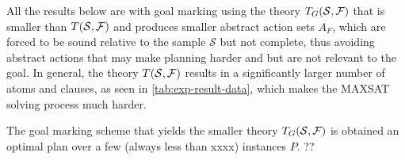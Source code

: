 \documentclass[letterpaper]{article} %
\newcommand{\abs}[1]{\ensuremath{\left\vert{#1}\right\vert}}
\newcommand{\Q}{\mathcal{Q}}
\begin{document}
All the results below are with goal marking using the theory $T_G({\cal S},{\cal F})$ that is
smaller than $T({\cal S,F})$ and produces smaller abstract action sets  $A_F$, which are forced
to be sound relative to the sample $\mathcal{S}$ but not complete, thus 
avoiding abstract actions that may make  planning harder and but are not relevant to the goal.
In general, the theory $T({\cal S},{\cal F})$ results in a significantly larger number of atoms and clauses,
as seen in \ref{tab:exp-result-data}, which makes the MAXSAT solving process much harder.


The goal marking scheme that  yields the smaller  theory $T_G({\cal S},{\cal F})$ is obtained an optimal plan over
a few (always less than xxxx) instances $P$. ??



\end{document}

